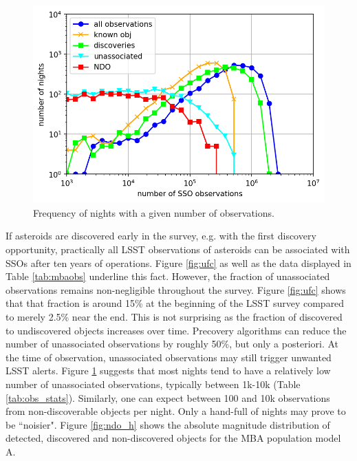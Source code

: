 %
\begin{figure}[tb!]
\begin{center}
\includegraphics[width=0.7\linewidth]{figs/nights_vs_obs.png} 
\end{center}
\caption{Frequency of nights with a given number of observations.\label{fig:obs_stats}}
\end{figure}
If asteroids are discovered early in the survey, e.g. with the first discovery opportunity, practically all \gls{LSST} observations of asteroids can be associated with SSOs after ten years of operations. Figure \ref{fig:ufc} as well as the data displayed in Table \ref{tab:mbaobs} underline this fact. 
However, the fraction of unassociated observations remains non-negligible throughout the survey.  
Figure \ref{fig:ufc} shows that that fraction is around 15\% at the beginning of the \gls{LSST} survey compared to merely 2.5\% near the end. This is not surprising as the fraction of discovered to undiscovered objects increases over time.
Precovery algorithms can reduce the number of unassociated observations by roughly 50\%, but only a posteriori. 
At the time of observation, unassociated observations may still trigger unwanted \gls{LSST} alerts. 
Figure \ref{fig:obs_stats} suggests that most nights tend to have a relatively low number of unassociated observations, typically between 1k-10k (Table \ref{tab:obs_stats}). Similarly, one can expect between 100 and 10k observations from non-discoverable objects per night. Only a hand-full of nights may prove to be ``noisier".
Figure \ref{fig:ndo_h} shows the absolute magnitude distribution of detected, discovered and non-discovered objects for the MBA population model A.
